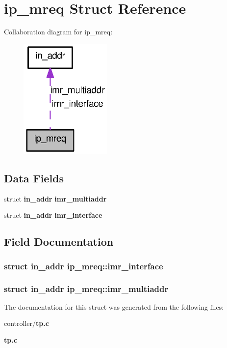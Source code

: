 \section{ip\_\-mreq Struct Reference}
\label{structip__mreq}


Collaboration diagram for ip\_\-mreq:
\nopagebreak
\begin{figure}[H]
\begin{center}
\leavevmode
\includegraphics[width=128pt]{structip__mreq__coll__graph}
\end{center}
\end{figure}
\subsection*{Data Fields}
\begin{DoxyCompactItemize}
\item 
struct {\bf in\_\-addr} {\bf imr\_\-multiaddr}
\item 
struct {\bf in\_\-addr} {\bf imr\_\-interface}
\end{DoxyCompactItemize}


\subsection{Field Documentation}
\subsubsection[{imr\_\-interface}]{\setlength{\rightskip}{0pt plus 5cm}struct {\bf in\_\-addr} {\bf ip\_\-mreq::imr\_\-interface}}\label{structip__mreq_a5a01c67398a3c25dab84996a04730a2a}
\subsubsection[{imr\_\-multiaddr}]{\setlength{\rightskip}{0pt plus 5cm}struct {\bf in\_\-addr} {\bf ip\_\-mreq::imr\_\-multiaddr}}\label{structip__mreq_a68a7523377d80bddb61cd260ed0d8658}


The documentation for this struct was generated from the following files:\begin{DoxyCompactItemize}
\item 
controller/{\bf tp.c}\item 
{\bf tp.c}\end{DoxyCompactItemize}
